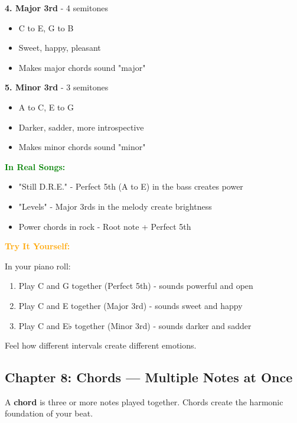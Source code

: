 \documentclass[11pt,letterpaper]{article}
\newcommand{\greentext}[1]{\textcolor{green}{\textbf{#1}}}
\newcommand{\orangetext}[1]{\textcolor{orange}{\textbf{#1}}}
\begin{document}
\textbf{4. Major 3rd} - 4 semitones
\begin{itemize}[leftmargin=*]
\item C to E, G to B
\item Sweet, happy, pleasant
\item Makes major chords sound "major"
\end{itemize}

\textbf{5. Minor 3rd} - 3 semitones
\begin{itemize}[leftmargin=*]
\item A to C, E to G
\item Darker, sadder, more introspective
\item Makes minor chords sound "minor"
\end{itemize}

\textbf{\greentext{In Real Songs:}}
\begin{itemize}[leftmargin=*]
\item "Still D.R.E." - Perfect 5th (A to E) in the bass creates power
\item "Levels" - Major 3rds in the melody create brightness
\item Power chords in rock - Root note + Perfect 5th
\end{itemize}

\textbf{\orangetext{Try It Yourself:}}

In your piano roll:
\begin{enumerate}[leftmargin=*]
\item Play C and G together (Perfect 5th) - sounds powerful and open
\item Play C and E together (Major 3rd) - sounds sweet and happy
\item Play C and E♭ together (Minor 3rd) - sounds darker and sadder
\end{enumerate}

Feel how different intervals create different emotions.

\newpage


\subsection{Chapter 8: Chords — Multiple Notes at Once}

A \textbf{chord} is three or more notes played together. Chords create the harmonic foundation of your beat.
\end{document}
